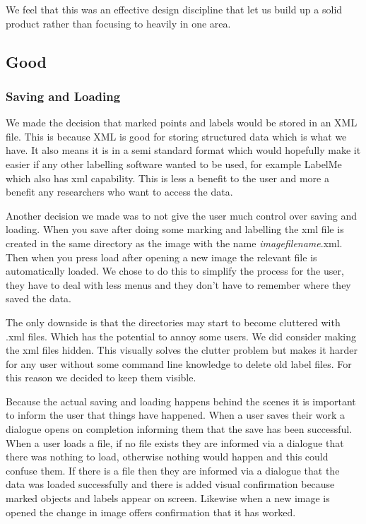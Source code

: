\documentclass[a4paper,11pt,oneside]{article}
\begin{document}
We feel that this was an effective design discipline that let us build up a solid product rather than focusing to heavily in one area.

\subsection{Good}

\subsubsection{Saving and Loading}
We made the decision that marked points and labels would be stored in an XML file.  This is because XML is good for storing structured data which is what we have.  It also means it is in a semi standard format which would hopefully make it easier if any other labelling software wanted to be used, for example LabelMe which also has xml capability.  This is less a benefit to the user and more a benefit any researchers who want to access the data.

Another decision we made was to not give the user much control over saving and loading.  When you save after doing some marking and labelling the xml file is created in the same directory as the image with the name \emph{imagefilename}.xml.  Then when you press load after opening a new image the relevant file is automatically loaded.  We chose to do this to simplify the process for the user, they have to deal with less menus and they don't have to remember where they saved the data.

The only downside is that the directories may start to become cluttered with .xml files.  Which has the potential to annoy some users.  We did consider making the xml files hidden.  This visually solves the clutter problem but makes it harder for any user without some command line knowledge to delete old label files.  For this reason we decided to keep them visible.

Because the actual saving and loading happens behind the scenes it is important to inform the user that things have happened.  When a user saves their work a dialogue opens on completion informing them that the save has been successful.  When a user loads a file, if no file exists they are informed via a dialogue that there was nothing to load, otherwise nothing would happen and this could confuse them.  If there is a file then they are informed via a dialogue that the data was loaded successfully and there is added visual confirmation because marked objects and labels appear on screen.  Likewise when a new image is opened the change in image offers confirmation that it has worked.
\end{document}
